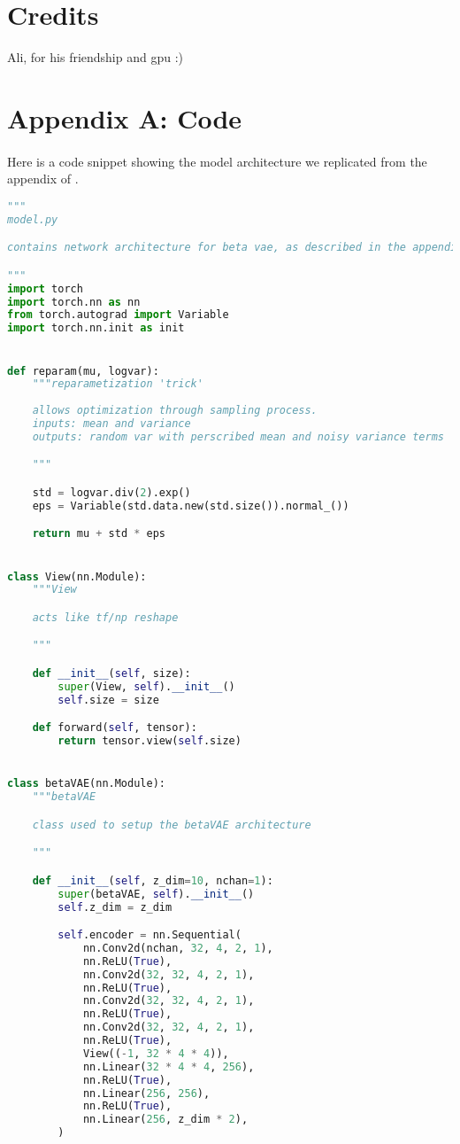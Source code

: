 \documentclass[justified,nobib]{tufte-handout}
\begin{document}
\begin{fullwidth}
\section{Credits}
Ali, for his friendship and gpu :)
\clearpage
\section{Appendix A: Code}
\paragraph{} Here is a code snippet showing the model architecture we replicated from the appendix of \cite{bvae}.
\begin{lstlisting}[language=Python]
"""
model.py

contains network architecture for beta vae, as described in the appendix of [2]

"""
import torch
import torch.nn as nn
from torch.autograd import Variable
import torch.nn.init as init


def reparam(mu, logvar):
    """reparametization 'trick'
    
    allows optimization through sampling process.
    inputs: mean and variance
    outputs: random var with perscribed mean and noisy variance terms

    """

    std = logvar.div(2).exp()
    eps = Variable(std.data.new(std.size()).normal_())

    return mu + std * eps


class View(nn.Module):
    """View

    acts like tf/np reshape

    """

    def __init__(self, size):
        super(View, self).__init__()
        self.size = size

    def forward(self, tensor):
        return tensor.view(self.size)


class betaVAE(nn.Module):
    """betaVAE

    class used to setup the betaVAE architecture 

    """

    def __init__(self, z_dim=10, nchan=1):
        super(betaVAE, self).__init__()
        self.z_dim = z_dim

        self.encoder = nn.Sequential(
            nn.Conv2d(nchan, 32, 4, 2, 1),
            nn.ReLU(True),
            nn.Conv2d(32, 32, 4, 2, 1),
            nn.ReLU(True),
            nn.Conv2d(32, 32, 4, 2, 1),
            nn.ReLU(True),
            nn.Conv2d(32, 32, 4, 2, 1),
            nn.ReLU(True),
            View((-1, 32 * 4 * 4)),
            nn.Linear(32 * 4 * 4, 256),
            nn.ReLU(True),
            nn.Linear(256, 256),
            nn.ReLU(True),
            nn.Linear(256, z_dim * 2),
        )


\end{lstlisting}
\end{fullwidth}
\end{document}
